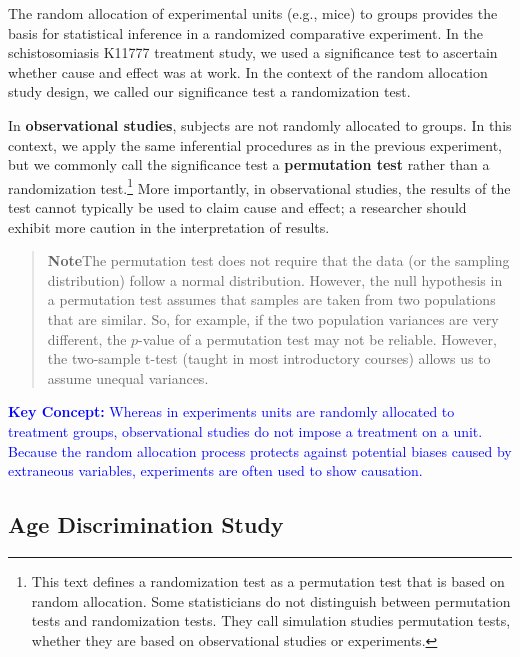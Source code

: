 \documentclass[
]{book}
\begin{document}
The random allocation of experimental units (e.g., mice) to groups provides the basis for statistical inference in a randomized comparative experiment. In the schistosomiasis K11777 treatment study, we used a significance test to ascertain whether cause and effect was at work. In the context of the random allocation study design,
we called our significance test a randomization test.

In \textbf{observational studies}, subjects are not randomly allocated to groups. In this context, we apply the same inferential procedures as in the previous experiment, but we commonly call the significance test a \textbf{permutation test} rather than a randomization test.\footnote{This text defines a randomization test as a permutation test that is based on random allocation. Some statisticians do not distinguish between permutation tests and randomization tests. They call simulation studies permutation tests, whether they are based on observational studies or experiments.} More importantly, in observational studies, the results of the test cannot typically be used to claim cause and effect; a researcher should exhibit more caution in the interpretation of results.

\begin{quote}
\textbf{Note}The permutation test does not require that the data (or the sampling distribution) follow a normal distribution. However, the null hypothesis in a permutation test assumes that samples are taken from two populations
that are similar. So, for example, if the two population variances are very different, the \(p\)-value of a permutation test may not be reliable. However, the two-sample t-test (taught in most introductory courses) allows us to assume unequal variances.
\end{quote}

\textbf{\textcolor{blue}{Key Concept:}}
\textcolor{blue}{Whereas in experiments units are randomly allocated to treatment groups, observational studies do not impose a treatment on a unit. Because the random allocation process protects against potential biases caused by extraneous variables, experiments are often used to show causation.}

\hypertarget{age-discrimination-study}{%
\subsection*{Age Discrimination Study}\label{age-discrimination-study}}
\end{document}
